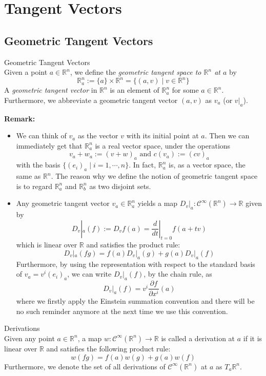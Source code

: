 \chapter{Tangent Vectors}

\section{Geometric Tangent Vectors}

\begin{definition}{Geometric Tangent Vectors}\\
Given a point $a\in \mathbb{R}^n$, we define the \textit{geometric tangent space to $\mathbb{R}^n$ at $a$} by
\[
\mathbb{R}_a^n:= \{a\}\times \mathbb{R}^n=\{ (a,v) \mid v\in \mathbb{R}^n\}
\]
A \textit{geometric tangent vector} in $\mathbb{R}^n$ is an element of $\mathbb{R}^n_a$ for some $a\in \mathbb{R}^n$. Furthermore, we abbreviate a geometric tangent vector $(a,v)$ as $v_a$ (or $v|_a$).
\end{definition}

\noindent\textbf{Remark:} \begin{itemize}
    \item We can think of $v_a$ as the vector $v$ with its initial point at $a$. Then we can immediately get that $\mathbb{R}_a^n$ is a real vector space, under the operations
    \[
    v_a+w_a:= (v+w)_a\text{ and } c(v_a):=(cv)_a
    \]
    with the basis $\{(e_i)_a \mid i=1,\cdots, n\}$. In fact, $\mathbb{R}_a^n$ is, as a vector space, the same as $\mathbb{R}^n$. The reason why we define the notion of geometric tangent space is to regard $\mathbb{R}_a^n$ and $\mathbb{R}_b^n$ as two disjoint sets.

    \item Any geometric tangent vector $v_a\in \mathbb{R}_a^n$ yields a map $D_v|_a: \mathcal{C}^\infty (\mathbb{R}^n)\to \mathbb{R}$ given by
    \[
    D_v|_a(f):= D_vf(a)= \frac{d}{dt}|_{t=0} f(a+tv)
    \]
    which is linear over $\mathbb{R}$ and satisfies the product rule:
    \[
    D_v|_a(fg)= f(a)D_v|_a (g)+ g(a) D_v|_a(f)
    \]
    Furthermore, by using the representation with respect to the standard basis of $v_a= v^i(e_i)_a$, we can write $D_v|_a(f)$, by the chain rule, as
    \[
    D_v|_a(f)= v^i\frac{\partial f}{\partial x^i} (a)
    \]
    where we firstly apply the Einstein summation convention and there will be no such reminder anymore at the next time we use this convention.
\end{itemize}

\begin{definition}{Derivations}\\
Given any point $a\in \mathbb{R}^n$, a map $w:\mathcal{C}^\infty (\mathbb{R}^n) \to \mathbb{R}$ is called a derivation at $a$ if it is linear over $\mathbb{R}$ and satisfies the following product rule:
\[
w(fg)= f(a)w(g)+ g(a)w(f)
\]
Furthermore, we denote the set of all derivations of $\mathcal{C}^\infty(\mathbb{R}^n)$ at $a$ as $T_a\mathbb{R}^n$.
\end{definition}


